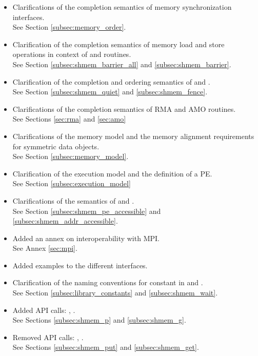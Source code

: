 \begin{itemize}
\item Clarifications of the completion semantics of memory synchronization 
interfaces.\\See Section \ref{subsec:memory_order}.
\item Clarification of the completion semantics of memory load and store 
operations in context of  and  
routines.\\See Section \ref{subsec:shmem_barrier_all} and \ref{subsec:shmem_barrier}.
\item Clarification of the completion and ordering semantics of  and .
\\See Section \ref{subsec:shmem_quiet} and \ref{subsec:shmem_fence}.
\item Clarifications of the completion semantics of \ac{RMA} and \ac{AMO} routines.
\\See Sections \ref{sec:rma} and \ref{sec:amo}
\item Clarifications of the memory model and the memory alignment requirements for symmetric data objects.
\\See Section \ref{subsec:memory_model}.
\item Clarification of the execution model and the definition of a \ac{PE}.
\\See Section \ref{subsec:execution_model}
\item Clarifications of the semantics of  and .
\\See Section \ref{subsec:shmem_pe_accessible} and \ref{subsec:shmem_addr_accessible}.
\item Added an annex on interoperability with \ac{MPI}.\\See Annex \ref{sec:mpi}.
\item Added examples to the different interfaces.
\item Clarification of the naming conventions for constant in \Clang{} and \Fortran{}.
\\See Section \ref{subsec:library_constants} and \ref{subsec:shmem_wait}.
\item Added \ac{API} calls: , .\\See Sections \ref{subsec:shmem_p} and \ref{subsec:shmem_g}. 
\item Removed \ac{API} calls: , .\\ See Sections \ref{subsec:shmem_put} and \ref{subsec:shmem_get}. 

\end{itemize}
